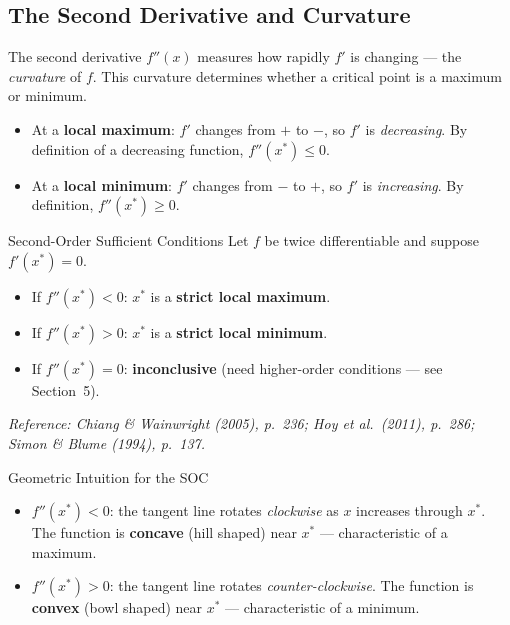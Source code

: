 \documentclass[12pt, a4paper]{article}
\theoremstyle{definition}
\begin{document}
\subsection{The Second Derivative and Curvature}

The second derivative $f''(x)$ measures how rapidly $f'$ is changing ---
the \emph{curvature} of $f$.  This curvature determines whether a critical
point is a maximum or minimum.

\begin{itemize}
  \item At a \textbf{local maximum}: $f'$ changes from $+$ to $-$,
        so $f'$ is \emph{decreasing}.  By definition of a decreasing
        function, $f''(x^*) \leq 0$.
  \item At a \textbf{local minimum}: $f'$ changes from $-$ to $+$,
        so $f'$ is \emph{increasing}.  By definition, $f''(x^*) \geq 0$.
\end{itemize}
\newpage
\begin{thmbox}{Second-Order Sufficient Conditions}
Let $f$ be twice differentiable and suppose $f'(x^*) = 0$.
\begin{itemize}
  \item If $f''(x^*) < 0$: \quad $x^*$ is a \textbf{strict local maximum}.
  \item If $f''(x^*) > 0$: \quad $x^*$ is a \textbf{strict local minimum}.
  \item If $f''(x^*) = 0$: \quad \textbf{inconclusive}
        (need higher-order conditions --- see Section~5).
\end{itemize}
\emph{Reference: Chiang \& Wainwright (2005), p.\ 236;
Hoy et al.\ (2011), p.\ 286; Simon \& Blume (1994), p.\ 137.}
\end{thmbox}

\begin{keybox}{Geometric Intuition for the SOC}
\begin{itemize}
  \item $f''(x^*) < 0$: the tangent line rotates \emph{clockwise} as $x$
        increases through $x^*$.  The function is \textbf{concave} (hill
        shaped) near $x^*$ --- characteristic of a maximum.
  \item $f''(x^*) > 0$: the tangent line rotates \emph{counter-clockwise}.
        The function is \textbf{convex} (bowl shaped) near $x^*$ ---
        characteristic of a minimum.
\end{itemize}
\end{keybox}
\end{document}
